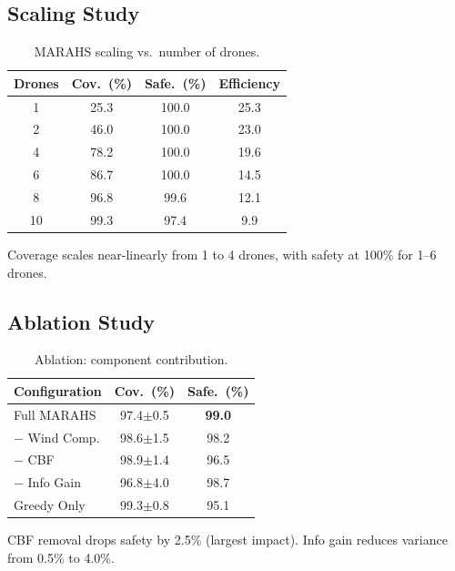 \documentclass[11pt,twocolumn]{article}
\theoremstyle{definition}
\begin{document}
\subsection{Scaling Study}

\begin{table}[t]
\centering
\caption{MARAHS scaling vs.\ number of drones.}
\label{tab:scale}
\small
\begin{tabular}{cccc}
\toprule
\textbf{Drones} & \textbf{Cov.\ (\%)} & \textbf{Safe.\ (\%)} & \textbf{Efficiency} \\
\midrule
1  & 25.3 & 100.0 & 25.3 \\
2  & 46.0 & 100.0 & 23.0 \\
4  & 78.2 & 100.0 & 19.6 \\
6  & 86.7 & 100.0 & 14.5 \\
8  & 96.8 & 99.6  & 12.1 \\
10 & 99.3 & 97.4  & 9.9  \\
\bottomrule
\end{tabular}
\end{table}

Coverage scales near-linearly from 1 to 4 drones, with safety at 100\% for 1--6 drones.

\subsection{Ablation Study}

\begin{table}[t]
\centering
\caption{Ablation: component contribution.}
\label{tab:ablation}
\small
\begin{tabular}{lcc}
\toprule
\textbf{Configuration} & \textbf{Cov.\ (\%)} & \textbf{Safe.\ (\%)} \\
\midrule
Full MARAHS     & 97.4$\pm$0.5 & \textbf{99.0} \\
$-$ Wind Comp.  & 98.6$\pm$1.5 & 98.2 \\
$-$ CBF         & 98.9$\pm$1.4 & 96.5 \\
$-$ Info Gain   & 96.8$\pm$4.0 & 98.7 \\
Greedy Only     & 99.3$\pm$0.8 & 95.1 \\
\bottomrule
\end{tabular}
\end{table}

CBF removal drops safety by 2.5\% (largest impact). Info gain reduces variance from 0.5\% to 4.0\%.

\end{document}
